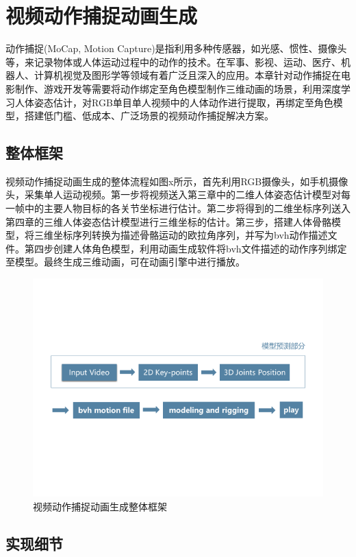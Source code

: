 
\chapter{视频动作捕捉动画生成}
动作捕捉(MoCap, Motion Capture)是指利用多种传感器，如光感、惯性、摄像头等，来记录物体或人体运动过程中的动作的技术。在军事、影视、运动、医疗、机器人、计算机视觉及图形学等领域有着广泛且深入的应用。本章针对动作捕捉在电影制作、游戏开发等需要将动作绑定至角色模型制作三维动画的场景，利用深度学习人体姿态估计，对RGB单目单人视频中的人体动作进行提取，再绑定至角色模型，搭建低门槛、低成本、广泛场景的视频动作捕捉解决方案。

\section{整体框架}

视频动作捕捉动画生成的整体流程如图x所示，首先利用RGB摄像头，如手机摄像头，采集单人运动视频。第一步将视频送入第三章中的二维人体姿态估计模型对每一帧中的主要人物目标的各关节坐标进行估计。第二步将得到的二维坐标序列送入第四章的三维人体姿态估计模型进行三维坐标的估计。第三步，搭建人体骨骼模型，将三维坐标序列转换为描述骨骼运动的欧拉角序列，并写为bvh动作描述文件。第四步创建人体角色模型，利用动画生成软件将bvh文件描述的动作序列绑定至模型。最终生成三维动画，可在动画引擎中进行播放。
\begin{figure}[h]
	\centering
	\includegraphics[scale=1]{figures/27.png}
	\caption{视频动作捕捉动画生成整体框架}
	\label{fig:f27}
\end{figure}

\section{实现细节}
